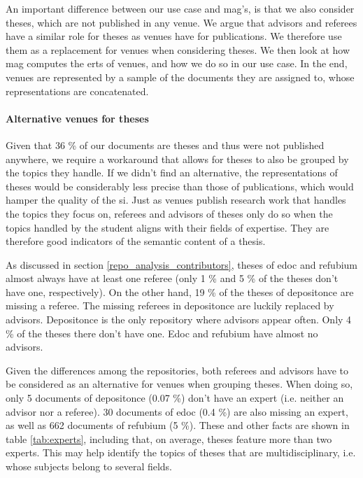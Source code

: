 An important difference between our use case and \acrshort{mag}'s, is that we also consider theses, which are not published in any venue. We argue that advisors and referees have a similar role for theses as venues have for publications. We therefore use them as a replacement for venues when considering theses. We then look at how \acrshort{mag} computes the \acrshort{ert}s of venues, and how we do so in our use case. In the end, venues are represented by a sample of the documents they are assigned to, whose representations are concatenated.

\paragraph{Alternative venues for theses} \mbox{} \label{unsupervised_approach_venues_theses}

Given that 36 \% of our documents are theses and thus were not published anywhere, we require a workaround that allows for theses to also be grouped by the topics they handle. If we didn't find an alternative, the representations of theses would be considerably less precise than those of publications, which would hamper the quality of the \acrshort{si}. Just as venues publish research work that handles the topics they focus on, referees and advisors of theses only do so when the topics handled by the student aligns with their fields of expertise. They are therefore good indicators of the semantic content of a thesis.

As discussed in section \ref{repo_analysis_contributors}, theses of edoc and refubium almost always have at least one referee (only 1 \% and 5 \% of the theses don't have one, respectively). On the other hand, 19 \% of the theses of depositonce are missing a referee. The missing referees in depositonce are luckily replaced by advisors. Depositonce is the only repository where advisors appear often. Only 4 \% of the theses there don't have one. Edoc and refubium have almost no advisors.

Given the differences among the repositories, both referees and advisors have to be considered as an alternative for venues when grouping theses. When doing so, only 5 documents of depositonce (0.07 \%) don't have an expert (i.e. neither an advisor nor a referee). 30 documents of edoc (0.4 \%) are also missing an expert, as well as 662 documents of refubium (5 \%). These and other facts are shown in table \ref{tab:experts}, including that, on average, theses feature more than two experts. This may help identify the topics of theses that are multidisciplinary, i.e. whose subjects belong to several fields.


